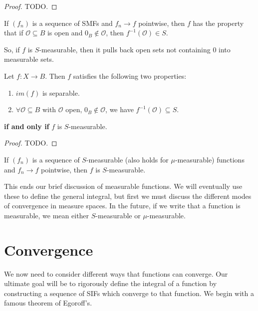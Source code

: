 	\begin{proof}
		TODO.
	\end{proof}
	
	\begin{corollary}
		If $(f_n)$ is a sequence of SMFs and $f_n\rightarrow f$ pointwise, then $f$ has the property that if $\mathcal O
		\subseteq B$ is open and $0_B\notin\mathcal O$, then $f^{-1}(\mathcal O)\in S$.
	\end{corollary}
	
	So, if $f$ is $S$-measurable, then it pulls back open sets not containing $0$ into measurable sets. 
	
	\begin{theorem}
		Let $f : X\rightarrow B$. Then $f$ satisfies the following two properties:
		\begin{enumerate}
			\item $im(f)$ is separable.
			\item $\forall\mathcal O\subseteq B$ with $\mathcal O$ open, $0_B\notin\mathcal O$, we have 
			$f^{-1}(\mathcal O)\subseteq S$. 
		\end{enumerate}
		\textbf{if and only if} $f$ is $S$-measurable.
	\end{theorem}
	
	\begin{proof}
		TODO.
	\end{proof}
	
	\begin{corollary}
		If $(f_n)$ is a sequence of $S$-measurable (also holds for $\mu$-measurable) functions and $f_n\rightarrow f$ 
		pointwise, then $f$ is $S$-measurable.
	\end{corollary}
	
	This ends our brief discussion of measurable functions. We will eventually use these to define the general integral, 
	but first we must discuss the different modes of convergence in measure spaces. In the future, if we write that a 
	function is measurable, we mean either $S$-measurable or $\mu$-measurable.
	
	\section{Convergence}
	
	We now need to consider different ways that functions can converge. Our ultimate goal will be to rigorously define the 
	integral of a function by constructing a sequence of SIFs which converge to that function. We begin with a famous 
	theorem of Egoroff's. 
	
